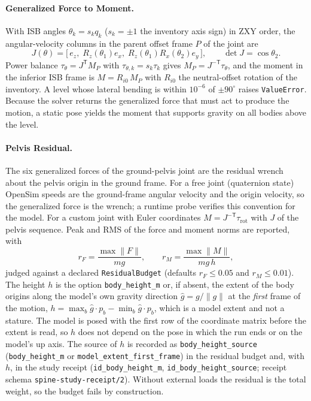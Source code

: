 \paragraph{Generalized Force to Moment.}
With ISB angles $\theta_k = s_k q_k$ ($s_k=\pm1$ the inventory axis sign) in
ZXY order, the angular-velocity columns in the parent offset frame $P$ of the
joint are
\[
  J(\theta) = \bigl[\,e_z,\; R_z(\theta_1)e_x,\; R_z(\theta_1)R_x(\theta_2)e_y\,\bigr],
  \qquad \det J = \cos\theta_2 .
\]
Power balance $\tau_\theta = J^{\mathsf T} M_P$ with $\tau_{\theta,k}=s_k\tau_k$
gives $M_P = J^{-\mathsf T}\tau_\theta$, and the moment in the inferior ISB
frame is $M = R_{i0}\,M_P$ with $R_{i0}$ the neutral-offset rotation of the
inventory. A level whose lateral bending is within $10^{-6}$ of $\pm 90^\circ$
raises \texttt{ValueError}. Because the solver returns the generalized force
that must act to produce the motion, a static pose yields the moment that
supports gravity on all bodies above the level.

\paragraph{Pelvis Residual.}
The six generalized forces of the ground-pelvis joint are the residual wrench
about the pelvis origin in the ground frame. For a free joint (quaternion
state) OpenSim speeds are the ground-frame angular velocity and the origin
velocity, so the generalized force is the wrench; a runtime probe verifies
this convention for the model. For a custom joint with Euler coordinates
$M = J^{-\mathsf T}\tau_{\mathrm{rot}}$ with $J$ of the pelvis sequence. Peak
and RMS of the force and moment norms are reported, with
\[
  r_F = \frac{\max\|F\|}{m g},\qquad
  r_M = \frac{\max\|M\|}{m g\,h},
\]
judged against a declared \texttt{ResidualBudget} (defaults $r_F\le 0.05$ and
$r_M\le 0.01$). The height $h$ is the option \texttt{body\_height\_m} or, if
absent, the extent of the body origins along the model's own gravity direction
$\hat g = g/\|g\|$ at the \emph{first} frame of the motion,
$h=\max_b \hat g\!\cdot\!p_b - \min_b \hat g\!\cdot\!p_b$, which is a model
extent and not a stature. The model is posed with the first row of the
coordinate matrix before the extent is read, so $h$ does not depend on the
pose in which the run ends or on the model's up axis. The source of $h$ is
recorded as \texttt{body\_height\_source} (\texttt{body\_height\_m} or
\texttt{model\_extent\_first\_frame}) in the residual budget and, with $h$, in
the study receipt (\texttt{id\_body\_height\_m}, \texttt{id\_body\_height\_source};
receipt schema \texttt{spine-study-receipt/2}). Without external loads the residual is the
total weight, so the budget fails by construction.

